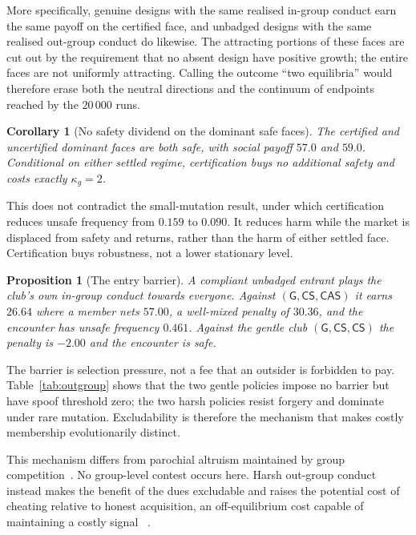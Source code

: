 \documentclass[a4paper,fleqn,longmktitle]{cas-sc}
\theoremstyle{plain}
\newtheorem{proposition}[theorem]{Proposition}
\newtheorem{corollary}[theorem]{Corollary}
\theoremstyle{definition}
\newcommand{\CS}{\textsf{CS}}
\newcommand{\CAS}{\textsf{CAS}}
\begin{document}
More specifically, genuine designs with the same realised in-group conduct
earn the same payoff on the certified face, and unbadged designs with the same
realised out-group conduct do likewise. The attracting portions of these faces
are cut out by the requirement that no absent design have positive growth;
the entire faces are not uniformly attracting. Calling the outcome ``two
equilibria'' would therefore erase both the neutral directions and the
continuum of endpoints reached by the $20\,000$ runs.

\begin{corollary}[No safety dividend on the dominant safe faces]
\label{cor:dues}
The certified and uncertified dominant faces are both safe, with social payoff
$57.0$ and $59.0$. Conditional on either settled regime, certification buys no
additional safety and costs exactly $\kappa_g=2$.
\end{corollary}

This does not contradict the small-mutation result, under which certification
reduces unsafe frequency from $0.159$ to $0.090$. It reduces harm while the
market is displaced from safety and returns, rather than the harm of either
settled face. Certification buys robustness, not a lower stationary level.

\begin{proposition}[The entry barrier]
\label{prop:exclusion}
A compliant unbadged entrant plays the club's own in-group conduct towards
everyone. Against $(\mathsf{G},\CS,\CAS)$ it earns $26.64$ where a member nets
$57.00$, a well-mixed penalty of $30.36$, and the encounter has unsafe
frequency $0.461$. Against the gentle club $(\mathsf{G},\CS,\CS)$ the penalty
is $-2.00$ and the encounter is safe.
\end{proposition}

The barrier is selection pressure, not a fee that an outsider is forbidden to
pay. Table~\ref{tab:outgroup} shows that the two gentle policies impose no
barrier but have spoof threshold zero; the two harsh policies resist forgery
and dominate under rare mutation. Excludability is therefore the mechanism
that makes costly membership evolutionarily distinct.

This mechanism differs from parochial altruism maintained by group
competition~\citep{choi2007parochial}. No group-level contest occurs here.
Harsh out-group conduct instead makes the benefit of the dues excludable and
raises the potential cost of cheating relative to honest acquisition, an
off-equilibrium cost capable of maintaining a costly signal
~\citep{szamado2011cost}.
\end{document}

